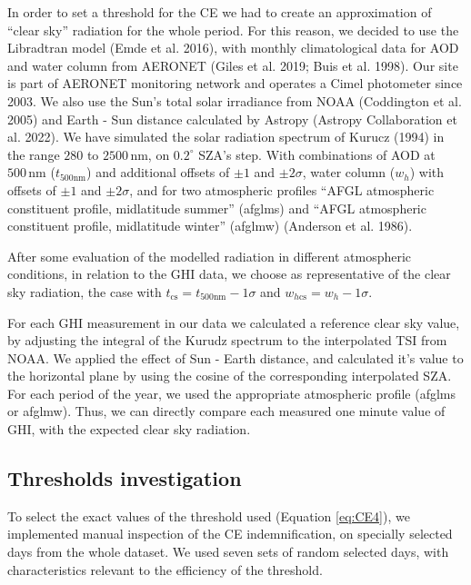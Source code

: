 \documentclass[
]{article}
\begin{document}
In order to set a threshold for the CE we had to create an approximation of ``clear sky'' radiation for the whole period.
For this reason, we decided to use the Libradtran model (Emde et al. 2016), with monthly climatological data for AOD and water column from AERONET (Giles et al. 2019; Buis et al. 1998). Our site is part of AERONET monitoring network and operates a Cimel photometer since 2003.
We also use the Sun's total solar irradiance from NOAA (Coddington et al. 2005) and Earth - Sun distance calculated by Astropy (Astropy Collaboration et al. 2022).
We have simulated the solar radiation spectrum of Kurucz (1994) in the range \(280\) to \(2500\,\text{nm}\), on \(0.2^\circ\) SZA's step.
With combinations of AOD at \(500\,\text{nm}\) (\(t_{500\text{nm}}\)) and additional offsets of \(\pm1\) and \(\pm2\sigma\), water column (\(w_h\)) with offsets of \(\pm1\) and \(\pm2\sigma\), and for two atmospheric profiles ``AFGL atmospheric constituent profile, midlatitude summer'' (afglms) and ``AFGL atmospheric constituent profile, midlatitude winter'' (afglmw) (Anderson et al. 1986).

After some evaluation of the modelled radiation in different atmospheric conditions, in relation to the GHI data, we choose as representative of the clear sky radiation, the case with \(t_{\text{cs}} = t_{500\text{nm}} - 1\sigma\) and \(w_{h\text{cs}} = w_h - 1\sigma\).

For each GHI measurement in our data we calculated a reference clear sky value, by adjusting the integral of the Kurudz spectrum to the interpolated TSI from NOAA. We applied the effect of Sun - Earth distance, and calculated it's value to the horizontal plane by using the cosine of the corresponding interpolated SZA.
For each period of the year, we used the appropriate atmospheric profile (afglms or afglmw).
Thus, we can directly compare each measured one minute value of GHI, with the expected clear sky radiation.

\hypertarget{thresholds-investigation}{%
\subsection{Thresholds investigation}\label{thresholds-investigation}}

To select the exact values of the threshold used (Equation \ref{eq:CE4}), we implemented manual inspection of the CE indemnification, on specially selected days from the whole dataset.
We used seven sets of random selected days, with characteristics relevant to the efficiency of the threshold.
\end{document}
